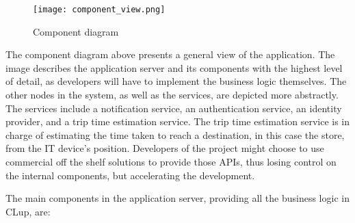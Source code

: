 \documentclass[../../main.tex]{subfiles}
\begin{document}
\begin{figure}[H]
    \centering
    \texttt{[image: component\_view.png]}
    \caption{
        Component diagram
    }
\end{figure}

The component diagram above presents a general view of the application. 
The image describes the application server and its components with the highest level of detail, 
as developers will have to implement the business logic themselves. The other nodes in the system, as well as the services, 
are depicted more abstractly. The services include a notification service, an authentication service, an identity provider,
and a trip time estimation service. The trip time estimation service is in charge of estimating the time taken to reach
a destination, in this case the store, from the IT device's position. 
Developers of the project might choose to use commercial off the shelf solutions to provide those APIs, 
thus losing control on the internal components, but accelerating the development.


The main components in the application server, providing all the business logic in CLup, are:
\end{document}
